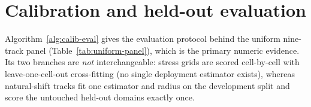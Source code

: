 
\section{Calibration and held-out evaluation}\label{app:calib-eval}
Algorithm~\ref{alg:calib-eval} gives the evaluation protocol behind the uniform
nine-track panel (Table~\ref{tab:uniform-panel}), which is the primary numeric
evidence. Its two branches are \emph{not} interchangeable: stress grids
are scored cell-by-cell with leave-one-cell-out cross-fitting (no single deployment estimator
exists), whereas natural-shift tracks fit one estimator and radius on the development split and
score the untouched held-out domains exactly once.

